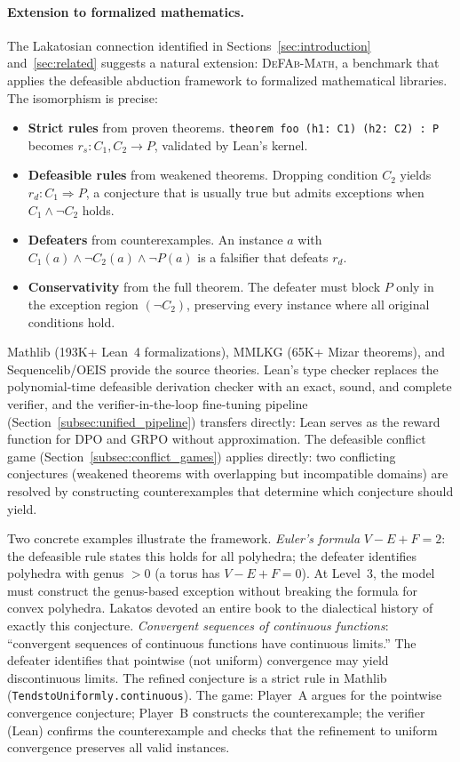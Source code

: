 \documentclass{article}
\theoremstyle{definition}
\newcommand{\defto}{\Rightarrow}
\newcommand{\strictto}{\rightarrow}
\begin{document}
\paragraph{Extension to formalized mathematics.} The Lakatosian connection identified in Sections~\ref{sec:introduction} and~\ref{sec:related} suggests a natural extension: \textsc{DeFAb-Math}, a benchmark that applies the defeasible abduction framework to formalized mathematical libraries. The isomorphism is precise:
\begin{itemize}[nosep]
    \item \textbf{Strict rules} from proven theorems. \texttt{theorem foo (h1: C1) (h2: C2) : P} becomes $r_s\colon C_1, C_2 \strictto P$, validated by Lean's kernel.
    \item \textbf{Defeasible rules} from weakened theorems. Dropping condition $C_2$ yields $r_d\colon C_1 \defto P$, a conjecture that is usually true but admits exceptions when $C_1 \wedge \neg C_2$ holds.
    \item \textbf{Defeaters} from counterexamples. An instance $a$ with $C_1(a) \wedge \neg C_2(a) \wedge \neg P(a)$ is a falsifier that defeats $r_d$.
    \item \textbf{Conservativity} from the full theorem. The defeater must block $P$ only in the exception region $(\neg C_2)$, preserving every instance where all original conditions hold.
\end{itemize}
Mathlib (193K+ Lean~4 formalizations), MMLKG (65K+ Mizar theorems), and Sequencelib/OEIS provide the source theories. Lean's type checker replaces the polynomial-time defeasible derivation checker with an exact, sound, and complete verifier, and the verifier-in-the-loop fine-tuning pipeline (Section~\ref{subsec:unified_pipeline}) transfers directly: Lean serves as the reward function for DPO and GRPO without approximation. The defeasible conflict game (Section~\ref{subsec:conflict_games}) applies directly: two conflicting conjectures (weakened theorems with overlapping but incompatible domains) are resolved by constructing counterexamples that determine which conjecture should yield.

Two concrete examples illustrate the framework. \textit{Euler's formula} $V - E + F = 2$: the defeasible rule states this holds for all polyhedra; the defeater identifies polyhedra with genus $> 0$ (a torus has $V - E + F = 0$). At Level~3, the model must construct the genus-based exception without breaking the formula for convex polyhedra. Lakatos devoted an entire book to the dialectical history of exactly this conjecture. \textit{Convergent sequences of continuous functions}: ``convergent sequences of continuous functions have continuous limits.'' The defeater identifies that pointwise (not uniform) convergence may yield discontinuous limits. The refined conjecture is a strict rule in Mathlib (\texttt{TendstoUniformly.continuous}). The game: Player~A argues for the pointwise convergence conjecture; Player~B constructs the counterexample; the verifier (Lean) confirms the counterexample and checks that the refinement to uniform convergence preserves all valid instances.
\end{document}
